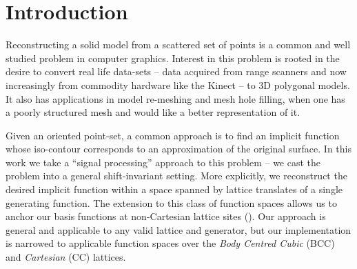 \section{Introduction}

\label{sec:intro}
Reconstructing a solid model from a scattered set of points is a common and well studied problem in computer graphics. 
Interest in this problem is rooted in the desire to convert real life data-sets -- data acquired from range scanners and now increasingly from commodity hardware like the Kinect -- to 3D polygonal models. 
It also has applications in model re-meshing and mesh hole filling, when one has a poorly structured mesh and would like a better representation of it. 

Given an oriented point-set, a common approach is to find an implicit function whose iso-contour corresponds to an approximation of the original surface. 
In this work we take a ``signal processing'' approach to this problem -- we cast the problem into a general shift-invariant setting. 
More explicitly, we reconstruct the desired implicit function within a space spanned by lattice translates of a single generating function. 
The extension to this class of function spaces allows us to anchor our basis functions at non-Cartesian lattice sites (). Our approach is general and applicable to any valid lattice and generator, but our implementation is narrowed to applicable function spaces over the \emph{Body Centred Cubic} (BCC) and \emph{Cartesian} (CC) lattices.

